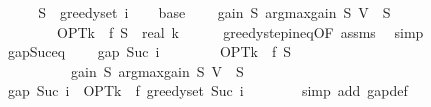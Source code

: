 \begin{isabellebody}
%
\isadelimproof
%
\endisadelimproof
%
\isatagproof
{}\isamarkupfalse%
\ {\isacharminus}{\kern0pt}\isanewline
\ \ \isamarkupfalse%
\ {\isacharquery}{\kern0pt}S\ {\isacharequal}{\kern0pt}\ {\isachardoublequoteopen}greedy{\isacharunderscore}{\kern0pt}set\ i{\isachardoublequoteclose}\isanewline
\isanewline
\ \ \isamarkupfalse%
\ base{\isacharcolon}{\kern0pt}\isanewline
\ \ \ \ {\isachardoublequoteopen}gain\ {\isacharquery}{\kern0pt}S\ {\isacharparenleft}{\kern0pt}argmax{\isacharunderscore}{\kern0pt}gain\ {\isacharquery}{\kern0pt}S\ {\isacharparenleft}{\kern0pt}V\ {\isacharminus}{\kern0pt}\ {\isacharquery}{\kern0pt}S{\isacharparenright}{\kern0pt}{\isacharparenright}{\kern0pt}\isanewline
\ \ \ \ \ \ \ {\isasymge}\ {\isacharparenleft}{\kern0pt}OPT{\isacharunderscore}{\kern0pt}k\ {\isacharminus}{\kern0pt}\ f\ {\isacharquery}{\kern0pt}S{\isacharparenright}{\kern0pt}\ {\isacharslash}{\kern0pt}\ real\ k{\isachardoublequoteclose}\isanewline
\ \ \ \ \isamarkupfalse%
\ greedy{\isacharunderscore}{\kern0pt}step{\isacharunderscore}{\kern0pt}ineq{\isacharbrackleft}{\kern0pt}OF\ assms{\isacharbrackright}{\kern0pt}\ \isamarkupfalse%
\ simp\isanewline
\isanewline
\ \ \isamarkupfalse%
\ gap{\isacharunderscore}{\kern0pt}Suc{\isacharunderscore}{\kern0pt}eq{\isacharcolon}{\kern0pt}\isanewline
\ \ \ \ {\isachardoublequoteopen}gap\ {\isacharparenleft}{\kern0pt}Suc\ i{\isacharparenright}{\kern0pt}\isanewline
\ \ \ \ \ \ \ {\isacharequal}{\kern0pt}\ OPT{\isacharunderscore}{\kern0pt}k\ {\isacharminus}{\kern0pt}\ f\ {\isacharquery}{\kern0pt}S\isanewline
\ \ \ \ \ \ \ \ \ {\isacharminus}{\kern0pt}\ gain\ {\isacharquery}{\kern0pt}S\ {\isacharparenleft}{\kern0pt}argmax{\isacharunderscore}{\kern0pt}gain\ {\isacharquery}{\kern0pt}S\ {\isacharparenleft}{\kern0pt}V\ {\isacharminus}{\kern0pt}\ {\isacharquery}{\kern0pt}S{\isacharparenright}{\kern0pt}{\isacharparenright}{\kern0pt}{\isachardoublequoteclose}\isanewline
\ \ \isamarkupfalse%
\ {\isacharminus}{\kern0pt}\isanewline
\ \ \ \ \isamarkupfalse%
\ {\isachardoublequoteopen}gap\ {\isacharparenleft}{\kern0pt}Suc\ i{\isacharparenright}{\kern0pt}\ {\isacharequal}{\kern0pt}\ OPT{\isacharunderscore}{\kern0pt}k\ {\isacharminus}{\kern0pt}\ f\ {\isacharparenleft}{\kern0pt}greedy{\isacharunderscore}{\kern0pt}set\ {\isacharparenleft}{\kern0pt}Suc\ i{\isacharparenright}{\kern0pt}{\isacharparenright}{\kern0pt}{\isachardoublequoteclose}\isanewline
\ \ \ \ \ \ \isamarkupfalse%
\ {\isacharparenleft}{\kern0pt}simp\ add{\isacharcolon}{\kern0pt}\ gap{\isacharunderscore}{\kern0pt}def{\isacharparenright}{\kern0pt}\isanewline

\end{isabellebody}
